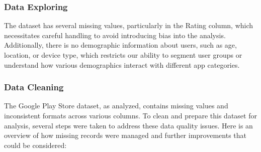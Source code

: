 \documentclass[
]{article}
\begin{document}
\subsubsection{Data Exploring}\label{data-exploring}

The dataset has several missing values, particularly in the Rating
column, which necessitates careful handling to avoid introducing bias
into the analysis. Additionally, there is no demographic information
about users, such as age, location, or device type, which restricts our
ability to segment user groups or understand how various demographics
interact with different app categories.

\subsubsection{Data Cleaning}\label{data-cleaning}

The Google Play Store dataset, as analyzed, contains missing values and
inconsistent formats across various columns. To clean and prepare this
dataset for analysis, several steps were taken to address these data
quality issues. Here is an overview of how missing records were managed
and further improvements that could be considered:
\end{document}

